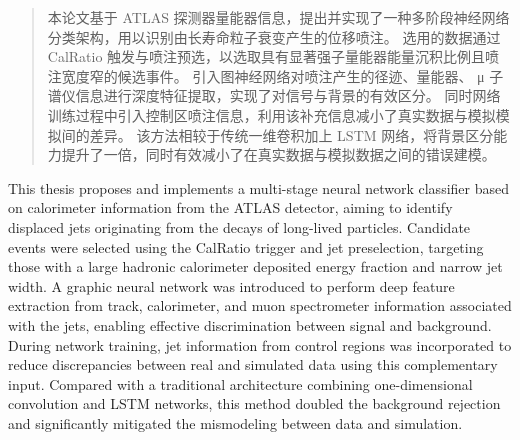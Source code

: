 

\begin{abstract}
  本论文基于 ATLAS 探测器量能器信息，提出并实现了一种多阶段神经网络分类架构，用以识别由长寿命粒子衰变产生的位移喷注。
  选用的数据通过 CalRatio 触发与喷注预选，以选取具有显著强子量能器能量沉积比例且喷注宽度窄的候选事件。
  引入图神经网络对喷注产生的径迹、量能器、 μ 子谱仪信息进行深度特征提取，实现了对信号与背景的有效区分。
  同时网络训练过程中引入控制区喷注信息，利用该补充信息减小了真实数据与模拟模拟间的差异。
  该方法相较于传统一维卷积加上 LSTM 网络，将背景区分能力提升了一倍，同时有效减小了在真实数据与模拟数据之间的错误建模。

\end{abstract}

\begin{abstract*}
  This thesis proposes and implements a multi-stage neural network classifier based on calorimeter information from the ATLAS detector,
  aiming to identify displaced jets originating from the decays of long-lived particles.
  Candidate events were selected using the CalRatio trigger and jet preselection,
  targeting those with a large hadronic calorimeter deposited energy fraction and narrow jet width.
  A graphic neural network was introduced to perform deep feature extraction from track, calorimeter,
  and muon spectrometer information associated with the jets, enabling effective discrimination between signal and background.
  During network training, jet information from control regions was incorporated
  to reduce discrepancies between real and simulated data using this complementary input.
  Compared with a traditional architecture combining one-dimensional convolution and LSTM networks,
  this method doubled the background rejection and significantly mitigated the mismodeling between data and simulation.
\end{abstract*}

